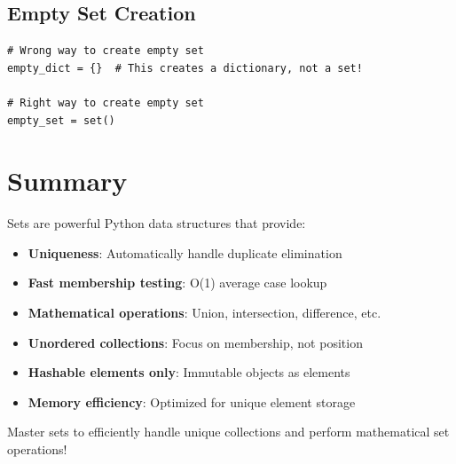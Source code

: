 \documentclass[12pt,a4paper]{article}
\begin{document}
\subsection{Empty Set Creation}

\begin{lstlisting}
# Wrong way to create empty set
empty_dict = {}  # This creates a dictionary, not a set!

# Right way to create empty set
empty_set = set()
\end{lstlisting}

\section{Summary}

Sets are powerful Python data structures that provide:
\begin{itemize}
    \item \textbf{Uniqueness}: Automatically handle duplicate elimination
    \item \textbf{Fast membership testing}: O(1) average case lookup
    \item \textbf{Mathematical operations}: Union, intersection, difference, etc.
    \item \textbf{Unordered collections}: Focus on membership, not position
    \item \textbf{Hashable elements only}: Immutable objects as elements
    \item \textbf{Memory efficiency}: Optimized for unique element storage
\end{itemize}

Master sets to efficiently handle unique collections and perform mathematical set operations!
\end{document}
